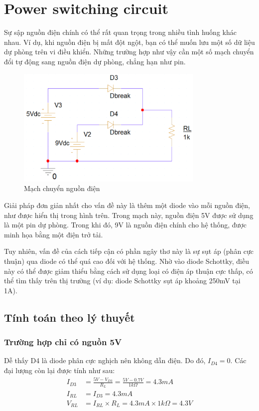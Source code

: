 \section{Power switching circuit}

Sự sập nguồn điện chính có thể rất quan trọng trong nhiều tình huống khác nhau. Ví dụ, khi nguồn điện bị mất đột ngột, bạn có thể muốn lưu một số dữ liệu dự phòng trên vi điều khiển. Những trường hợp như vậy cần một số mạch chuyển đổi tự động sang nguồn điện dự phòng, chẳng hạn như pin.

\begin{figure}[H]
    \centering
    \includegraphics[width=0.8\textwidth]{graphics/ex5/f1.png}
    \caption{Mạch chuyển nguồn điện}
\end{figure}
Giải pháp đơn giản nhất cho vấn đề này là thêm một diode vào mỗi nguồn điện, như được hiển thị trong hình trên. Trong mạch này, nguồn điện 5V được sử dụng là một pin dự phòng. Trong khi đó, 9V là nguồn điện chính cho hệ thống, được minh họa bằng một điện trở tải.


Tuy nhiên, vấn đề của cách tiếp cận có phần ngây thơ này là sự sụt áp (phân cực thuận) qua diode có thể quá cao đối với hệ thống. Nhờ vào diode Schottky, điều này có thể được giảm thiểu bằng cách sử dụng loại có điện áp thuận cực thấp, có thể tìm thấy trên thị trường (ví dụ: diode Schottky sụt áp khoảng 250mV tại 1A).

\subsection{Tính toán theo lý thuyết}
\subsubsection{Trường hợp chỉ có nguồn 5V}
Dễ thấy D4 là diode phân cực nghịch nên không dẫn điện. Do đó, \(I_{D4} = 0\). Các đại lượng còn lại được tính như sau:
\begin{align*}
I_{D3} &= \frac{5V - V_{D3}}{R_{L}} = \frac{5V - 0.7V}{1k\Omega} = 4.3mA  \\
I_{RL} &= I_{D3} = 4.3mA \\
V_{RL} &= I_{RL} \times R_{L} = 4.3mA \times 1k\Omega = 4.3V
\end{align*}

